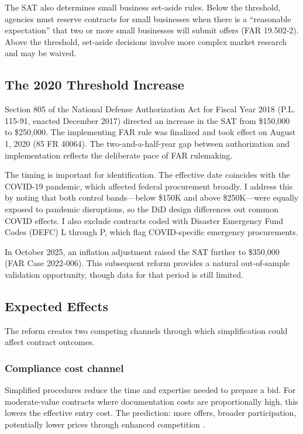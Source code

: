 \documentclass[12pt]{article}
\begin{document}
The SAT also determines small business set-aside rules. Below the threshold, agencies must reserve contracts for small businesses when there is a ``reasonable expectation'' that two or more small businesses will submit offers (FAR 19.502-2). Above the threshold, set-aside decisions involve more complex market research and may be waived.

\subsection{The 2020 Threshold Increase}

Section 805 of the National Defense Authorization Act for Fiscal Year 2018 (P.L. 115-91, enacted December 2017) directed an increase in the SAT from \$150,000 to \$250,000. The implementing FAR rule was finalized and took effect on August 1, 2020 (85 FR 40064). The two-and-a-half-year gap between authorization and implementation reflects the deliberate pace of FAR rulemaking.

The timing is important for identification. The effective date coincides with the COVID-19 pandemic, which affected federal procurement broadly. I address this by noting that both control bands---below \$150K and above \$250K---were equally exposed to pandemic disruptions, so the DiD design differences out common COVID effects. I also exclude contracts coded with Disaster Emergency Fund Codes (DEFC) L through P, which flag COVID-specific emergency procurements.

In October 2025, an inflation adjustment raised the SAT further to \$350,000 (FAR Case 2022-006). This subsequent reform provides a natural out-of-sample validation opportunity, though data for that period is still limited.

\subsection{Expected Effects}

The reform creates two competing channels through which simplification could affect contract outcomes.

\subsubsection*{Compliance cost channel} Simplified procedures reduce the time and expertise needed to prepare a bid. For moderate-value contracts where documentation costs are proportionally high, this lowers the effective entry cost. The prediction: more offers, broader participation, potentially lower prices through enhanced competition \citep{krasnokutskaya2011, bandiera2009}.
\end{document}
